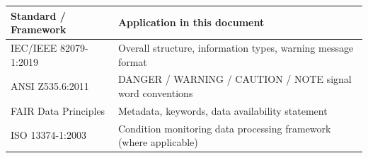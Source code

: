 \begin{center}
\begin{tabularx}{\textwidth}{@{} l X @{}}
  \toprule
  \textbf{Standard / Framework} & \textbf{Application in this document} \\
  \midrule
  IEC/IEEE 82079-1:2019 & Overall structure, information types, warning message format \\
  \rowcolor{PBALightGray}
  ANSI Z535.6:2011 & DANGER / WARNING / CAUTION / NOTE signal word conventions \\
  FAIR Data Principles \cite{wilkinson2016fair} & Metadata, keywords, data availability statement \\
  \rowcolor{PBALightGray}
  ISO 13374-1:2003 & Condition monitoring data processing framework (where applicable) \\
  \bottomrule
\end{tabularx}
\end{center}

\clearpage
